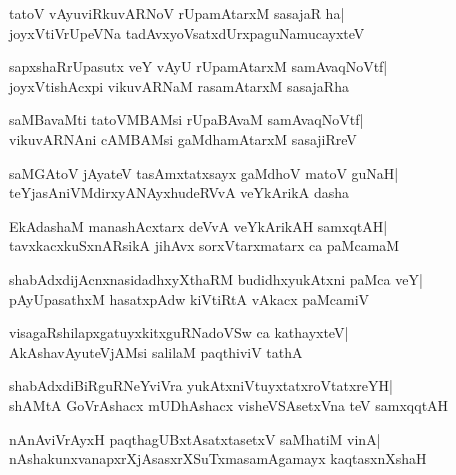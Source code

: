 \documentclass[twoside,12pt,openright]{book}
\newcounter{shloka}[chapter]
\begin{document}
\begin{shloka}%
tatoV vAyuviRkuvARNoV rUpamAtarxM sasajaR ha|\\
joyxVtiVrUpeVNa tadAvxyoVsatxdUrxpaguNamucayxteV
\end{shloka}

\begin{shloka}%
sapxshaRrUpasutx veY vAyU rUpamAtarxM samAvaqNoVtf|\\
joyxVtishAcxpi vikuvARNaM rasamAtarxM sasajaRha
\end{shloka}

\begin{shloka}%
saMBavaMti tatoVMBAMsi rUpaBAvaM samAvaqNoVtf|\\
vikuvARNAni cAMBAMsi gaMdhamAtarxM sasajiRreV
\end{shloka}

\begin{shloka}%
saMGAtoV jAyateV tasAmxtatxsayx gaMdhoV matoV guNaH|\\
teYjasAniVMdirxyANAyxhudeRVvA veYkArikA dasha
\end{shloka}

\begin{shloka}%
EkAdashaM manashAcxtarx deVvA veYkArikAH samxqtAH|\\
tavxkacxkuSxnARsikA jihAvx sorxVtarxmatarx ca paMcamaM
\end{shloka}

\begin{shloka}%
shabAdxdijAcnxnasidadhxyXthaRM budidhxyukAtxni paMca veY|\\
pAyUpasathxM hasatxpAdw kiVtiRtA vAkacx paMcamiV
\end{shloka}

\begin{shloka}%
visagaRshilapxgatuyxkitxguRNadoVSw ca kathayxteV|\\
AkAshavAyuteVjAMsi salilaM paqthiviV tathA
\end{shloka}

\begin{shloka}%
shabAdxdiBiRguRNeYviVra yukAtxniVtuyxtatxroVtatxreYH|\\
shAMtA GoVrAshacx mUDhAshacx visheVSAsetxVna teV samxqqtAH
\end{shloka}

\begin{shloka}%
nAnAviVrAyxH paqthagUBxtAsatxtasetxV saMhatiM vinA|\\
nAshakunxvanapxrXjAsasxrXSuTxmasamAgamayx kaqtasxnXshaH
\end{shloka}
\end{document}

